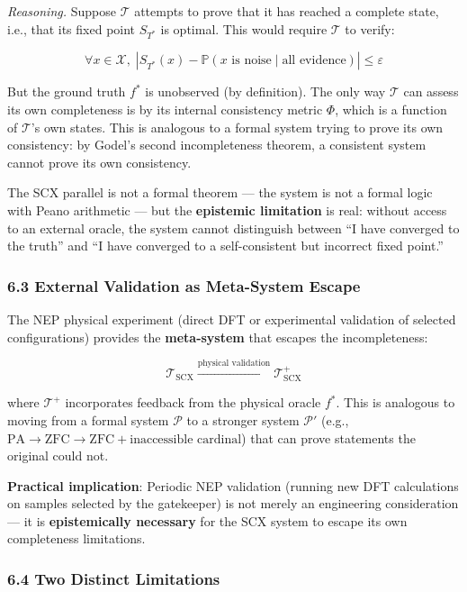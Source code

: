 \documentclass[
  12pt,
]{ctexart}
\begin{document}
\emph{Reasoning.} Suppose \(\mathcal{T}\) attempts to prove that it has
reached a complete state, i.e., that its fixed point \(S_{T^*}\) is
optimal. This would require \(\mathcal{T}\) to verify:

\[\forall x \in \mathcal{X}, \; |S_{T^*}(x) - \mathbb{P}(x \text{ is noise} \mid \text{all evidence})| \leq \varepsilon\]

But the ground truth \(f^*\) is unobserved (by definition). The only way
\(\mathcal{T}\) can assess its own completeness is by its internal
consistency metric \(\Phi\), which is a function of \(\mathcal{T}\)'s
own states. This is analogous to a formal system trying to prove its own
consistency: by Godel's second incompleteness theorem, a consistent
system cannot prove its own consistency.

The SCX parallel is not a formal theorem --- the system is not a formal
logic with Peano arithmetic --- but the \textbf{epistemic limitation} is
real: without access to an external oracle, the system cannot
distinguish between ``I have converged to the truth'' and ``I have
converged to a self-consistent but incorrect fixed point.''

\subsubsection{6.3 External Validation as Meta-System
Escape}\label{external-validation-as-meta-system-escape}

The NEP physical experiment (direct DFT or experimental validation of
selected configurations) provides the \textbf{meta-system} that escapes
the incompleteness:

\[\mathcal{T}_{\text{SCX}} \xrightarrow{\text{physical validation}} \mathcal{T}^+_{\text{SCX}}\]

where \(\mathcal{T}^+\) incorporates feedback from the physical oracle
\(f^*\). This is analogous to moving from a formal system
\(\mathcal{P}\) to a stronger system \(\mathcal{P}'\) (e.g.,
\(\text{PA} \to \text{ZFC} \to \text{ZFC} + \text{inaccessible cardinal}\))
that can prove statements the original could not.

\textbf{Practical implication}: Periodic NEP validation (running new DFT
calculations on samples selected by the gatekeeper) is not merely an
engineering consideration --- it is \textbf{epistemically necessary} for
the SCX system to escape its own completeness limitations.

\subsubsection{6.4 Two Distinct
Limitations}\label{two-distinct-limitations}
\end{document}
